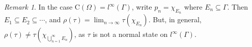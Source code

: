 \documentclass[12pt, oneside, psamsfonts]{amsart}
\newtheorem{lem}[thm]{Lemma}
\theoremstyle{definition}
\theoremstyle{remark}
\newtheorem{rem}[thm]{Remark}
\numberwithin{equation}{section}
\begin{document}
\begin{rem}
In the case $\mathrm{C}(\Omega) = l^\infty(\Gamma)$, write $p_n = \chi_{E_n}$ where $E_n \subseteq  \Gamma$. Then $E_1 \subseteq E_2 \subseteq \cdots$, and
$\rho(\tau) = \lim_{n \to\infty}\tau(\chi_{E_n})$. But, in general, $\rho(\tau) \neq \tau(\chi_{\bigcup_{n=1}^\infty E_n})$, as $\tau$ is not a normal state on $l^\infty(\Gamma)$.
\end{rem}

%
%
%
\end{document}
